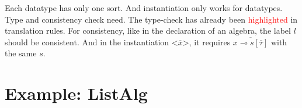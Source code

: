 \documentclass[a4paper]{article}
\newcommand{\red}[1]{\textcolor{red}{#1}}
\begin{document}
Each datatype has only one sort. And instantiation only works for datatypes.\\

Type and consistency check need. The type-check has already been \red{highlighted} in translation rules. For consistency, like in the declaration of an algebra, the label $l$ should be consistent. And in the instantiation $\texttt{<}\overline{x}\texttt{>}$, it requires $\overline{x \multimap s[\overline{\tau}]}$ with the same $s$.

\section{Example: ListAlg}

~
\end{document}
